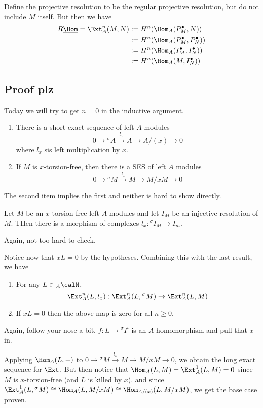 \documentclass[12pt]{article}
\begin{document}
Define the projective resolution to be the regular projective resolution, but do not include $M$ itself. But then we have
\begin{align*}
	R\underline{\Hom}=\Ext_A^n(M,N)&:=H^n(\Hom_A(P^\bullet_M,N))\\
	&:=H^n(\Hom_A(P_M^\bullet,P_N^\bullet))\\
	&:=H^n(\Hom_A(I_M^\bullet, I_N^\bullet))\\
	&:=H^n(\Hom_A(M,I_N^\bullet))
\end{align*}

\subsection{Proof plz}
Today we will try to get $n=0$ in the inductive argument.
\begin{lem}
	\begin{enumerate}
		\item  There is a short exact sequence of left $A$ modules
		\[0\to {^\sigma A}\xrightarrow{l_x}A\to A/(x)\to 0\]
		where $l_x$ sis left multiplication by $x$.
		\item If $M$ is $x$-torsion-free, then there is a SES of left $A$ modules
		\[0\to {^\sigma M}\xrightarrow{l_x}M\to M/xM\to 0\]
	\end{enumerate}
\end{lem}
The second item implies the first and neither is hard to show directly.
\begin{lem}
	Let $M$ be an $x$-torsion-free left $A$ modules and let $I_M$ be an injective resolution of $M$. THen there is a morphism of complexes
	$l_x:{^\sigma I_M}\to I_m$.
\end{lem}
Again, not too hard to check.

\brk

Notice now that $xL=0$ by the hypotheses. Combining this with the last result, we have
\begin{lem}
	\begin{enumerate}
		\item For any $L\in {_A\calM}$,
		\[\Ext_A^n(L,l_x):\Ext_A^n(L,{^\sigma M})\to \Ext_A^n(L,M)\]
		\item If $xL=0$ then the above map is zero for all $n\ge 0$.
	\end{enumerate}
\end{lem}
Again, follow your nose a bit. $f:L\to {^\sigma I^i}$ is an $A$ homomorphism and pull that $x$ in.

Applying $\Hom_A(L,-)$ to $0\to {^\sigma M}\xrightarrow{l_x}M\to M/xM\to 0$, we obtain the long exact sequence
for $\Ext$. But then notice that $\Hom_A(L,M)=\Ext_A^1(L,M)=0$ since $M$ is $x$-torsion-free (and $L$ is killed by $x$).
and since $\Ext_A^1(L,{^\sigma M})\cong \Hom_A(L,M/xM)\cong\Hom_{A/(x)}(L,M/xM)$, we get the base case proven.
\end{document}
